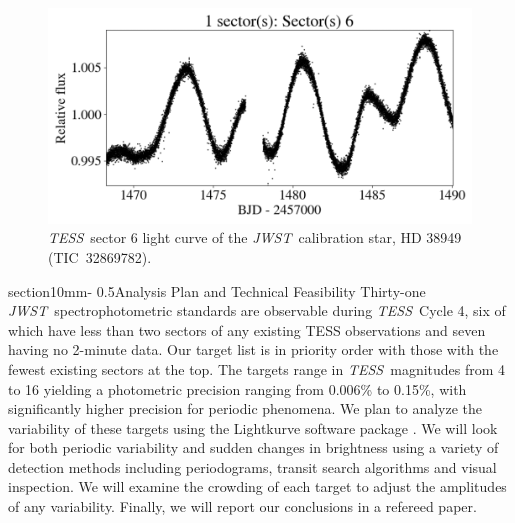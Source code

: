 \documentclass[letterpaper,12pt]{article}
\makeatletter
\renewcommand{\section}{\@startsection%
{section}{1}{0mm}{-\baselineskip}%
{0.5\baselineskip}{\normalfont\large\bfseries}}%
\newcommand{\tess}{{\it TESS}}
\newcommand{\jwst}{{\it JWST}}
\makeatother
\begin{document}
\begin{figure}
    \centering
    \includegraphics[scale=.5]{HR38949_lc.png}
    \caption{\tess\ sector 6 light curve of the \jwst\ calibration star, HD 38949 (TIC~32869782).}
    \label{fig:lc}
\end{figure}




\vspace{-1em}
\section{Analysis Plan and Technical Feasibility}
Thirty-one \jwst\ spectrophotometric standards are observable during \tess\ Cycle 4, six of which have less than two sectors of any existing TESS observations and seven having no 2-minute data. Our target list is in priority order with those with the fewest existing sectors at the top. The targets range in \tess\ magnitudes from 4 to 16 yielding a photometric precision ranging from 0.006\% to 0.15\%, with significantly higher precision for periodic phenomena.  We plan to analyze the variability of these targets using the Lightkurve software package \citep{2018ascl.soft12013L}. We will look for both periodic variability and sudden changes in brightness using a variety of detection methods including periodograms, transit search algorithms and visual inspection. We will examine the crowding of each target to adjust the amplitudes of any variability. Finally, we will report our conclusions in a refereed paper.
\end{document}
